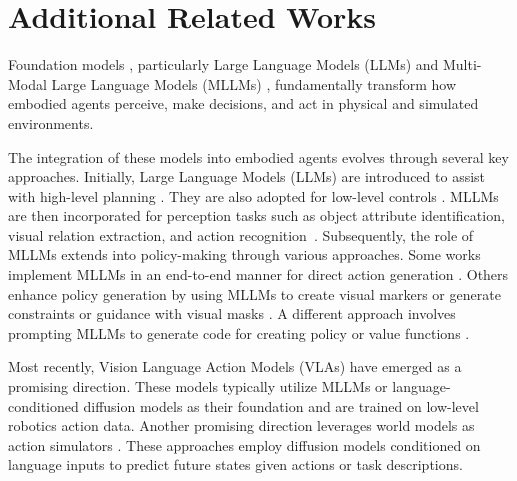 \section{Additional Related Works} \label{ap:additional_related_works}

Foundation models \cite{bommasani2021opportunities}, particularly Large Language Models (LLMs) \cite{GPT3,achiam2023gpt,touvron2023llama,yang2024qwen2,yang2024rewards} and Multi-Modal Large Language Models (MLLMs) \cite{radford2021learning, team2024gemini, wang2024qwen2, wu2024deepseek, du2025kimi, singletransformer2024,xie2024large}, fundamentally transform how embodied agents perceive, make decisions, and act in physical and simulated environments. 

The integration of these models into embodied agents evolves through several key approaches. Initially, Large Language Models (LLMs) are introduced to assist with high-level planning \cite{ahn2022can, huang2022language, huang2022inner, rana2023sayplan,gao2024physically, huang2023grounded,wang2023voyager,huang2023instruct2act,schema2023d,schema2023e,chen2023robogpt,huang2023embodied,zhou2024navgpt}. They are also adopted for low-level controls \cite{mao2023gpt,yin2024context}. MLLMs are then incorporated for perception tasks such as object attribute identification, visual relation extraction, and action recognition~\cite{xiao2022robotic, ViStruct2023, actionpatch2023,wang2023describe, gao2024physically, gu2024conceptgraphs}. Subsequently, the role of MLLMs extends into policy-making through various approaches. Some works implement MLLMs in an end-to-end manner for direct action generation \cite{shridhar2022cliport, driess2023palm, du2023video,yang2024embodied,mu2024embodiedgpt}. Others enhance policy generation by using MLLMs to create visual markers or generate constraints or guidance with visual masks \cite{sharma2023semantic, stone2023open, nasiriany2024pivot, huang2024copa, jiang2024roboexp}. A different approach involves prompting MLLMs to generate code for creating policy or value functions \cite{liang2023code, huang2023voxposer, huang2024rekep}.



Most recently, Vision Language Action Models (VLAs) \cite{brohan2022rt, brohan2023rt, chi2023diffusion, belkhale2024rt, team2024octo, liu2024rdt, kim2024openvla} have emerged as a promising direction. These models typically utilize MLLMs or language-conditioned diffusion models as their foundation and are trained on low-level robotics action data. Another promising direction leverages world models as action simulators \cite{xiang2024pandora, agarwal2025cosmos, liu2025physgen}. These approaches employ diffusion models conditioned on language inputs to predict future states given actions or task descriptions.

